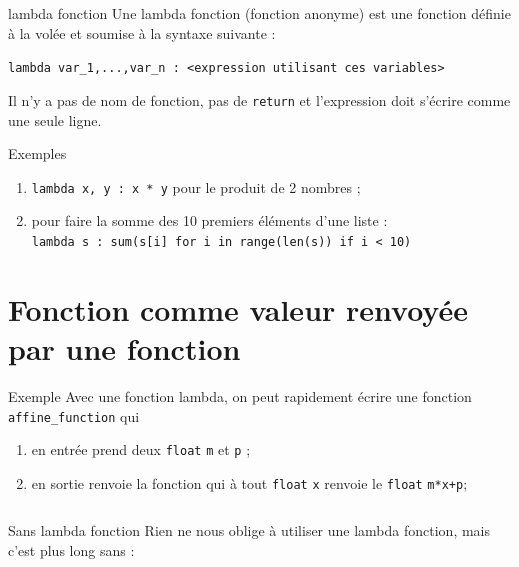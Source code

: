 \documentclass[10pt]{beamer}
\begin{document}
\begin{frame}[fragile]{lambda fonction}
Une lambda fonction (fonction anonyme) est une fonction définie à la volée et soumise à la syntaxe suivante :\\\pause
	
\texttt{lambda var_1,...,var_n : <expression utilisant ces variables>}\\\pause
	
Il n'y a pas de nom de fonction, pas de \texttt{return} et l'expression doit s'écrire comme une seule ligne.
\end{frame}

\begin{frame}[fragile]{Exemples}
	\begin{enumerate}[--]
		\item 	\texttt{lambda x, y : x *  y} pour le produit de 2 nombres ;\pause
		\item 	pour faire la somme des 10 premiers éléments d'une liste :\\
		\texttt{lambda s : sum(s[i] for i in range(len(s)) if i < 10)}	
	\end{enumerate}	
\end{frame}

\section*{Fonction comme valeur renvoyée par une fonction}

\begin{frame}[fragile]{Exemple}
Avec une fonction lambda, on peut rapidement écrire une fonction \texttt{affine_function} qui\pause
\begin{enumerate}[--]
	\item 	en entrée prend deux \texttt{float} \texttt{m} et \texttt{p} ;\pause
	\item 	en sortie renvoie la fonction qui à tout \texttt{float} \texttt{x} renvoie le \texttt{float} \texttt{m*x+p};\pause
\end{enumerate}
\inputminted{python}{scripts/func3.py}
\end{frame}

\begin{frame}[fragile]{Sans lambda fonction}
Rien ne nous oblige à utiliser une lambda fonction, mais c'est plus long sans :\pause
\inputminted{python}{scripts/func4.py}
\end{frame}
\end{document}
